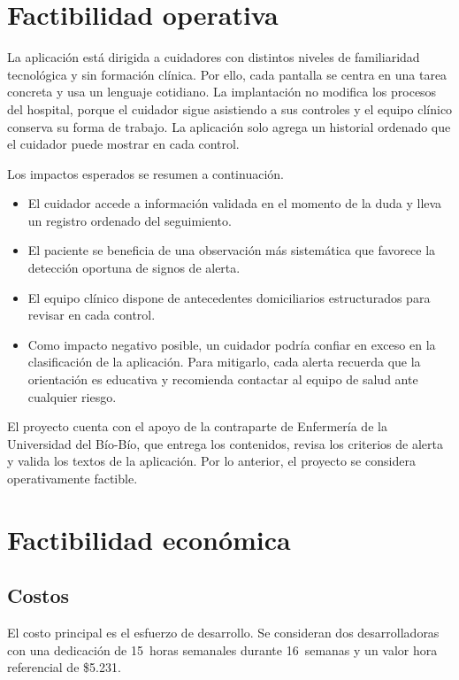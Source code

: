 \section[Operativa]{Factibilidad operativa}

La aplicación está dirigida a cuidadores con distintos niveles de familiaridad
tecnológica y sin formación clínica. Por ello, cada pantalla se centra en una
tarea concreta y usa un lenguaje cotidiano. La implantación no modifica los
procesos del hospital, porque el cuidador sigue asistiendo a sus controles y el
equipo clínico conserva su forma de trabajo. La aplicación solo agrega un
historial ordenado que el cuidador puede mostrar en cada control.

Los impactos esperados se resumen a continuación.

\begin{itemize}
    \item El cuidador accede a información validada en el momento de la duda y
    lleva un registro ordenado del seguimiento.
    \item El paciente se beneficia de una observación más sistemática que
    favorece la detección oportuna de signos de alerta.
    \item El equipo clínico dispone de antecedentes domiciliarios estructurados
    para revisar en cada control.
    \item Como impacto negativo posible, un cuidador podría confiar en exceso en
    la clasificación de la aplicación. Para mitigarlo, cada alerta recuerda que
    la orientación es educativa y recomienda contactar al equipo de salud ante
    cualquier riesgo.
\end{itemize}

El proyecto cuenta con el apoyo de la contraparte de Enfermería de la
Universidad del Bío-Bío, que entrega los contenidos, revisa los criterios de
alerta y valida los textos de la aplicación. Por lo anterior, el proyecto se
considera operativamente factible.

\section[Económica]{Factibilidad económica}

\subsection{Costos}

El costo principal es el esfuerzo de desarrollo. Se consideran dos
desarrolladoras con una dedicación de 15~horas semanales durante 16~semanas y
un valor hora referencial de \$5.231.

